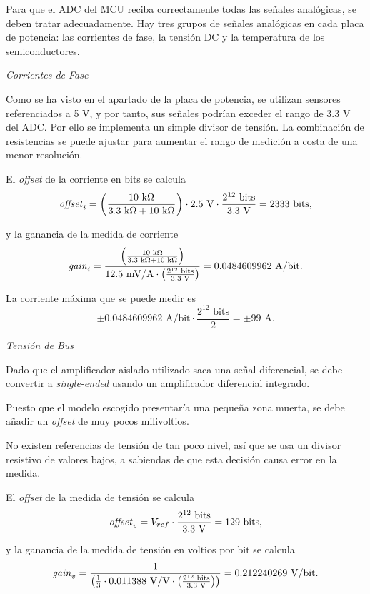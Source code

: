 Para que el ADC del MCU reciba correctamente todas las señales analógicas, se deben tratar adecuadamente. Hay tres grupos de señales analógicas en cada placa de potencia: las corrientes de fase, la tensión DC y la temperatura de los semiconductores.

\textit{Corrientes de Fase}

Como se ha visto en el apartado de la placa de potencia, se utilizan sensores referenciados a 5 V, y por tanto, sus señales podrían exceder el rango de 3.3 V del ADC. Por ello se implementa un simple divisor de tensión. La combinación de resistencias se puede ajustar para aumentar el rango de medición a costa de una menor resolución. 

El \textit{offset} de la corriente en bits se calcula
\[ \text{\textit{offset}}_i = \left(\frac{10 \text{ k}\Omega}{3.3\text{ k}\Omega+10\text{ k}\Omega}\right) \cdot 2.5 \text{ V} \cdot \frac{2^{12} \text{ bits}}{3.3\text{ V}} = 2333 \text{ bits,} \]

y la ganancia de la medida de corriente
\[ \text{\textit{gain}}_i = \frac{\left(\frac{10\text{ k}\Omega}{3.3\text{ k}\Omega+10\text{ k}\Omega}\right)}{12.5 \text{ mV/A} \cdot \left(\frac{2^{12} \text{ bits}}{3.3\text{ V}}\right)} = 0.0484609962 \text{ A/bit.} \]

La corriente máxima que se puede medir es
\[ \pm 0.0484609962 \text{ A/bit} \cdot \frac{2^{12} \text{ bits}}{2} = \pm 99 \text{ A.} \]

\textit{Tensión de Bus}

Dado que el amplificador aislado utilizado saca una señal diferencial, se debe convertir a \textit{single-ended} usando un amplificador diferencial integrado. 

Puesto que el modelo escogido presentaría una pequeña zona muerta, se debe añadir un \textit{offset} de muy pocos milivoltios. 

No existen referencias de tensión de tan poco nivel, así que se usa un divisor resistivo de valores bajos, a sabiendas de que esta decisión causa error en la medida. 

El \textit{offset} de la medida de tensión se calcula
\[ \text{\textit{offset}}_v = V_{ref} \cdot \frac{2^{12} \text{ bits}}{3.3\text{ V}} = 129 \text{ bits,} \]

y la ganancia de la medida de tensión en voltios por bit se calcula
\[ \text{\textit{gain}}_v = \frac{1}{\left(\frac{1}{3} \cdot 0.011388 \text{ V/V} \cdot \left(\frac{2^{12} \text{ bits}}{3.3\text{ V}}\right)\right)} = 0.212240269 \text{ V/bit.} \]

